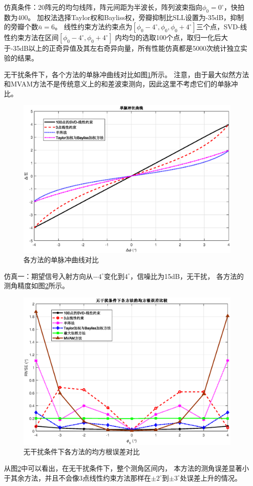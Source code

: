 \documentclass[master]{thesis-uestc}
\begin{document}
仿真条件：20阵元的均匀线阵，阵元间距为半波长，阵列波束指向$\phi_0=0^\circ$，快拍数为400。
加权法选择Taylor权和Bayliss权，旁瓣抑制比SLL设置为-35dB，抑制的旁瓣个数$\bar{n}=6$。
线性约束方法约束点为$[\phi_0-4^\circ,\phi_0,\phi_0+4^\circ]$三个点，SVD-线性约束方法在区间$[\phi_0-4^\circ,\phi_0+4^\circ]$
内均匀的选取100个点，取归一化后大于-35dB以上的正奇异值及其左右奇异向量，所有性能仿真都是5000次统计独立实验的结果。

无干扰条件下，各个方法的单脉冲曲线对比如图\ref{SVD-JLC_MRC_cmp}所示。
注意，由于最大似然方法和MVAM方法不是传统意义上的和差波束测向，因此这里不考虑它们的单脉冲比。
\begin{figure}[H]
    \includegraphics[scale=0.5]{pic/SVD-JLC_MRC_cmp.eps}
    \caption{各方法的单脉冲曲线对比}
    \label{SVD-JLC_MRC_cmp}
\end{figure}

仿真一：期望信号入射方向从$-4^\circ$变化到$4^\circ$，信噪比为15dB，无干扰，
各方法的测角精度如图\ref{SVD-JLC_RMSE_jamming_free}所示。
\begin{figure}[H]
    \includegraphics[scale=0.5]{pic/SVD-JLC_RMSE_jamming_free.eps}
    \caption{无干扰条件下各方法的均方根误差对比}
    \label{SVD-JLC_RMSE_jamming_free}
\end{figure}
从图\ref{SVD-JLC_RMSE_jamming_free}中可以看出，在无干扰条件下，整个测角区间内，
本方法的测角误差显著小于其余方法，并且不会像3点线性约束方法那样在$\pm2^\circ$到$\pm3^\circ$处误差上升的情况。
\end{document}
